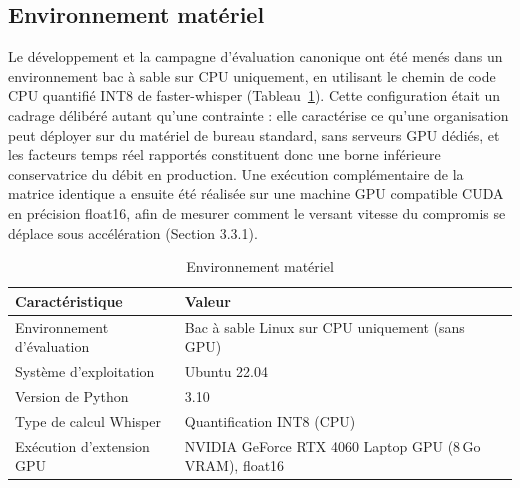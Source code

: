 \documentclass[12pt]{report}
\begin{document}
\subsection{Environnement matériel}
Le développement et la campagne d'évaluation canonique ont été menés dans un environnement bac à sable sur CPU uniquement, en utilisant le chemin de code CPU quantifié INT8 de faster-whisper (Tableau~\ref{tab:hardware}). Cette configuration était un cadrage délibéré autant qu'une contrainte : elle caractérise ce qu'une organisation peut déployer sur du matériel de bureau standard, sans serveurs GPU dédiés, et les facteurs temps réel rapportés constituent donc une borne inférieure conservatrice du débit en production. Une exécution complémentaire de la matrice identique a ensuite été réalisée sur une machine GPU compatible CUDA en précision float16, afin de mesurer comment le versant vitesse du compromis se déplace sous accélération (Section 3.3.1).
\begin{table}[H]
\centering
\begin{tabular}{|l|l|}
\hline
\textbf{Caractéristique} & \textbf{Valeur} \\ \hline
Environnement d'évaluation & Bac à sable Linux sur CPU uniquement (sans GPU) \\ \hline
Système d'exploitation & Ubuntu 22.04 \\ \hline
Version de Python & 3.10 \\ \hline
Type de calcul Whisper & Quantification INT8 (CPU) \\ \hline
Exécution d'extension GPU & NVIDIA GeForce RTX 4060 Laptop GPU (8\,Go VRAM), float16 \\ \hline
\end{tabular}
\caption{Environnement matériel}
\label{tab:hardware}
\end{table}
\end{document}
